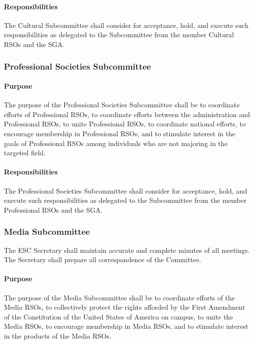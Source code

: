 \documentclass[12pt]{scrreprt}
\begin{document}
\paragraph{Responsibilities}
The Cultural Subcommittee shall consider for acceptance, hold, and
execute such responsibilities as delegated to the Subcommittee from the member Cultural RSOs and the SGA.

\subsubsection{Professional Societies Subcommittee}

\paragraph{Purpose}
​The purpose of the Professional Societies Subcommittee shall be to coordinate
efforts of Professional RSOs, to coordinate efforts between the administration and
Professional RSOs, to unite Professional RSOs, to coordinate national efforts, to encourage
membership in Professional RSOs, and to stimulate interest in the goals of Professional
RSOs among individuals who are not majoring in the targeted field.


\paragraph{Responsibilities}
The Professional Societies Subcommittee shall consider for
acceptance, hold, and execute such responsibilities as delegated to the Subcommittee from
the member Professional RSOs and the SGA.

\subsubsection{Media Subcommittee}
The ESC Secretary shall maintain accurate and complete minutes of all
meetings. The Secretary shall prepare all correspondence of the Committee.

\paragraph{Purpose}
​The purpose of the Media Subcommittee shall be to coordinate efforts of the
Media RSOs, to collectively protect the rights afforded by the First Amendment of the
Constitution of the United States of America on campus, to unite the Media RSOs, to
encourage membership in Media RSOs, and to stimulate interest in the products of the
Media RSOs.
\end{document}
